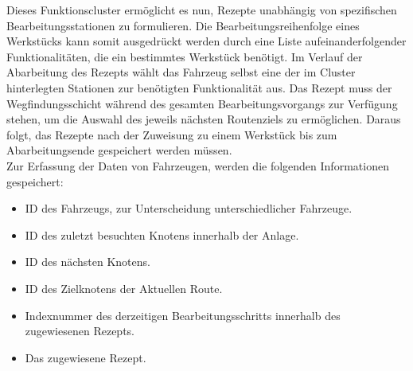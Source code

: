 			Dieses Funktionscluster ermöglicht es nun, Rezepte unabhängig von spezifischen Bearbeitungsstationen zu formulieren. Die Bearbeitungsreihenfolge eines Werkstücks kann somit ausgedrückt werden durch eine Liste aufeinanderfolgender Funktionalitäten, die ein bestimmtes Werkstück benötigt. Im Verlauf der Abarbeitung des Rezepts wählt das Fahrzeug selbst eine der im Cluster hinterlegten Stationen zur benötigten Funktionalität aus. Das Rezept muss der Wegfindungsschicht während des gesamten Bearbeitungsvorgangs zur Verfügung stehen, um die Auswahl des jeweils nächsten Routenziels zu ermöglichen. Daraus folgt, das Rezepte nach der Zuweisung zu einem Werkstück bis zum Abarbeitungsende gespeichert werden müssen.
			\\
			Zur Erfassung der Daten von Fahrzeugen, werden die folgenden Informationen gespeichert:
			
			\begin{itemize}
				\item ID des Fahrzeugs, zur Unterscheidung unterschiedlicher Fahrzeuge.
				\item ID des zuletzt besuchten Knotens innerhalb der Anlage.
				\item ID des nächsten Knotens. 
				\item ID des Zielknotens der Aktuellen Route.
				\item Indexnummer des derzeitigen Bearbeitungsschritts innerhalb des zugewiesenen Rezepts.
				\item Das zugewiesene Rezept.
			\end{itemize} 
			
